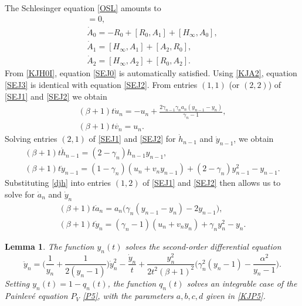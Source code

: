 \documentclass[10pt, reqno]{amsart}
\numberwithin{equation}{section}
\newtheorem{lemma}{Lemma}[section]
\numberwithin{equation}{section}
\begin{document}
The Schlesinger equation \eqref{OSL} amounts to
\begin{gather}
[R_0,A_0]=0,\label{SEJ0}\\
\dot{A}_0=-R_0+[R_0,A_1]+[H_\infty,A_0],\label{SEJ1}\\
\dot{A}_1=[H_\infty,A_1]+[A_2,R_0],\label{SEJ2}\\
\dot{A}_2=[H_\infty,A_2]+[R_0,A_2]\label{SEJ3}.
\end{gather}
From \eqref{KJH0I}, equation \eqref{SEJ0} is automatically satisfied. Using \eqref{KJA2}, equation \eqref{SEJ3} is identical with equation \eqref{SEJ2}. From entries $(1,1)$ (or $(2,2)$) of \eqref{SEJ1} and \eqref{SEJ2}
we obtain
\begin{gather}
(\beta+1)t\dot{u}_n=-u_n+\frac{2\gamma_{n-1}\gamma_na_n(y_{n-1}-y_n)}{\gamma_n-1},\nonumber\\
(\beta+1)t\dot{v_n}=u_n.\label{djv}
\end{gather}
Solving entries $(2,1)$ of \eqref{SEJ1} and \eqref{SEJ2} for $\dot{h}_{n-1}$ and $\dot{y}_{n-1}$, we obtain
\begin{gather}
(\beta+1)t\dot{h}_{n-1}=(2-\gamma_n)h_{n-1}y_{n-1},\label{djh}\\
(\beta+1)t\dot{y}_{n-1}=(1-\gamma_n)(u_n+v_ny_{n-1})+(2-\gamma_n)y_{n-1}^2-y_{n-1}.\nonumber
\end{gather}
Substituting \eqref{djh} into entries $(1,2)$ of \eqref{SEJ1} and \eqref{SEJ2} then allows us to solve for $\dot{a}_n$ and $\dot{y}_n$
\begin{gather}
(\beta+1)t\dot{a}_n=a_n\big(\gamma_n(y_{n-1}-y_n)-2y_{n-1}\big),\label{dja}\\
(\beta+1)t\dot{y}_n=(\gamma_n-1)(u_n+v_ny_n)+\gamma_ny_n^2-y_n.\label{djy}
\end{gather}
\begin{lemma} \label{lemma 4.2}
The function $y_n(t)$ solves the second-order differential equation
\begin{equation}
\ddot{y}_n=\Big(\frac{1}{y_n}+\frac{1}{2(y_n-1)}\Big)\dot{y}_n^2-\frac{\dot{y}_n}{t}+
\frac{y_n^2}{2t^2(\beta+1)^2}\Big(\gamma_n^2(y_n-1)-\frac{\alpha^2}{y_n-1}\Big). \label{pj}
\end{equation}
Setting $y_n(t)=1-q_n(t)$, the function $q_n(t)$ solves an integrable case of the Painlevé equation $P_V$ \eqref{P5}, with the parameters $a,b,c,d$ given in \eqref{KJP5}.
\end{lemma}
\end{document}
